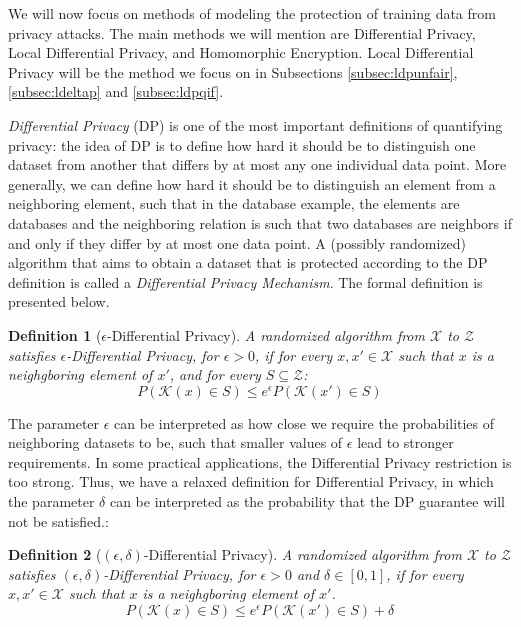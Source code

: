 \documentclass[conference]{IEEEtran}
\newtheorem{definition}{Definition}
\begin{document}
We will now focus on methods of modeling the protection of training data from privacy attacks. The main methods we will mention are Differential Privacy, Local Differential Privacy, and Homomorphic Encryption. Local Differential Privacy will be the method we focus on in Subsections \ref{subsec:ldpunfair}, \ref{subsec:ldeltap} and \ref{subsec:ldpqif}.

\emph{Differential Privacy} (DP) is one of the most important definitions of quantifying privacy: the idea of DP is to define how hard it should be to distinguish one dataset from another that differs by at most any one individual data point. More generally, we can define how hard it should be to distinguish an element from a neighboring element, such that in the database example, the elements are databases and the neighboring relation is such that two databases are neighbors if and only if they differ by at most one data point. A (possibly randomized) algorithm that aims to obtain a dataset that is protected according to the DP definition is called a \emph{Differential Privacy Mechanism}. The formal definition is presented below. 

\begin{definition}[$\epsilon$-Differential Privacy] A randomized algorithm from $\mathcal{X}$ to $\mathcal{Z}$ satisfies $\epsilon$-Differential Privacy, for $\epsilon > 0$, if for every $x,x' \in \mathcal{X}$ such that $x$ is a neighgboring element of $x'$, and for every $S \subseteq \mathcal{Z}$:
$$P(\mathcal{K}(x) \in S) \leq e^\epsilon P(\mathcal{K}(x')\in S)$$
\end{definition}

The parameter $\epsilon$ can be interpreted as how close we require the probabilities of neighboring datasets to be, such that smaller values of $\epsilon$ lead to stronger requirements. In some practical applications, the Differential Privacy restriction is too strong. Thus, we have a relaxed definition for Differential Privacy, in which the parameter $\delta$ can be interpreted as the probability that the DP guarantee will not be satisfied.:

\begin{definition}[$(\epsilon,\delta)$-Differential Privacy] A randomized algorithm from $\mathcal{X}$ to $\mathcal{Z}$ satisfies $(\epsilon,\delta)$-Differential Privacy, for $\epsilon > 0$ and $\delta \in [0,1]$, if for every $x,x' \in \mathcal{X}$ such that $x$ is a neighgboring element of $x'$.
$$P(\mathcal{K}(x) \in S) \leq e^\epsilon P(\mathcal{K}(x')\in S)+\delta$$
\end{definition}
\end{document}
